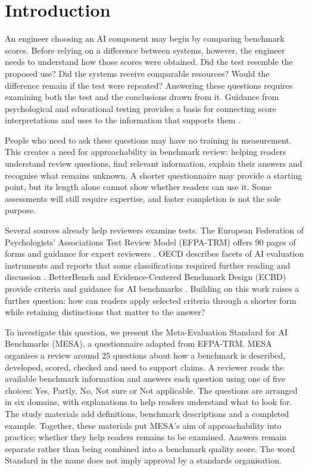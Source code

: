 \documentclass[10pt,conference]{IEEEtran}
\begin{document}
\section{Introduction}
An engineer choosing an AI component may begin by comparing benchmark scores. Before relying on a difference between systems, however, the engineer needs to understand how those scores were obtained. Did the test resemble the proposed use? Did the systems receive comparable resources? Would the difference remain if the test were repeated? Answering these questions requires examining both the test and the conclusions drawn from it. Guidance from psychological and educational testing provides a basis for connecting score interpretations and uses to the information that supports them \cite{aera_apa_ncme_standards_2014}.

People who need to ask these questions may have no training in measurement. This creates a need for approachability in benchmark review: helping readers understand review questions, find relevant information, explain their answers and recognise what remains unknown. A shorter questionnaire may provide a starting point, but its length alone cannot show whether readers can use it. Some assessments will still require expertise, and faster completion is not the sole purpose.

Several sources already help reviewers examine tests. The European Federation of Psychologists' Associations Test Review Model (EFPA-TRM) offers 90 pages of forms and guidance for expert reviewers \cite{efpa_test_review_model_2025}. OECD describes facets of AI evaluation instruments and reports that some classifications required further reading and discussion \cite{cohn_hernandez_orallo_oecd_2023}. BetterBench and Evidence-Centered Benchmark Design (ECBD) provide criteria and guidance for AI benchmarks \cite{reuel_betterbench,liu_ecbd_2024}. Building on this work raises a further question: how can readers apply selected criteria through a shorter form while retaining distinctions that matter to the answer?

To investigate this question, we present the Meta-Evaluation Standard for AI Benchmarks (MESA), a questionnaire adapted from EFPA-TRM. MESA organises a review around 25 questions about how a benchmark is described, developed, scored, checked and used to support claims. A reviewer reads the available benchmark information and answers each question using one of five choices: Yes, Partly, No, Not sure or Not applicable. The questions are arranged in six domains, with explanations to help readers understand what to look for. The study materials add definitions, benchmark descriptions and a completed example. Together, these materials put MESA's aim of approachability into practice; whether they help readers remains to be examined. Answers remain separate rather than being combined into a benchmark quality score. The word Standard in the name does not imply approval by a standards organisation.
\end{document}

